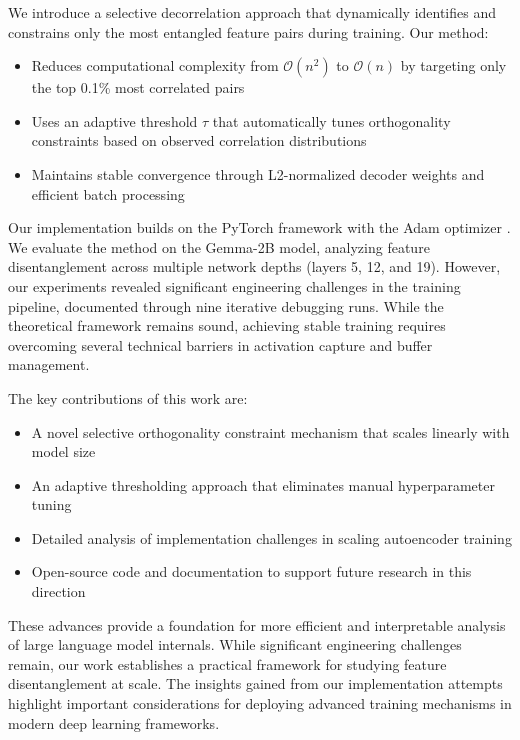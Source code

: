 \documentclass{article} %
\begin{document}
We introduce a selective decorrelation approach that dynamically identifies and constrains only the most entangled feature pairs during training. Our method:
\begin{itemize}
    \item Reduces computational complexity from $\mathcal{O}(n^2)$ to $\mathcal{O}(n)$ by targeting only the top 0.1\% most correlated pairs
    \item Uses an adaptive threshold $\tau$ that automatically tunes orthogonality constraints based on observed correlation distributions
    \item Maintains stable convergence through L2-normalized decoder weights and efficient batch processing
\end{itemize}

Our implementation builds on the PyTorch framework \cite{paszke2019pytorch} with the Adam optimizer \cite{kingma2014adam}. We evaluate the method on the Gemma-2B model, analyzing feature disentanglement across multiple network depths (layers 5, 12, and 19). However, our experiments revealed significant engineering challenges in the training pipeline, documented through nine iterative debugging runs. While the theoretical framework remains sound, achieving stable training requires overcoming several technical barriers in activation capture and buffer management.

The key contributions of this work are:
\begin{itemize}
    \item A novel selective orthogonality constraint mechanism that scales linearly with model size
    \item An adaptive thresholding approach that eliminates manual hyperparameter tuning
    \item Detailed analysis of implementation challenges in scaling autoencoder training
    \item Open-source code and documentation to support future research in this direction
\end{itemize}

These advances provide a foundation for more efficient and interpretable analysis of large language model internals. While significant engineering challenges remain, our work establishes a practical framework for studying feature disentanglement at scale. The insights gained from our implementation attempts highlight important considerations for deploying advanced training mechanisms in modern deep learning frameworks.
\end{document}
